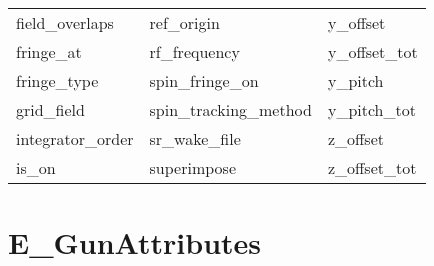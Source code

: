 \begin{tabular}{lll}
field_overlaps              & ref_origin                  & y_offset                    \\
fringe_at                   & rf_frequency                & y_offset_tot                \\
fringe_type                 & spin_fringe_on              & y_pitch                     \\
grid_field                  & spin_tracking_method        & y_pitch_tot                 \\
integrator_order            & sr_wake_file                & z_offset                    \\
is_on                       & superimpose                 & z_offset_tot                \\
 \bottomrule
 \end{tabular}
 \vfill
 
 \section{E_GunAttributes}
 \label{s:list.e.gun}
 
